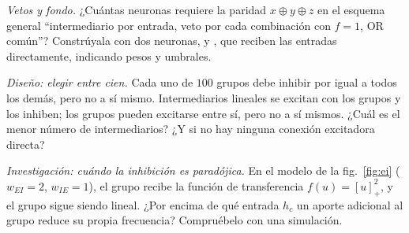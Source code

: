 \begin{exercise}[\lvlB]
\label{ex:03:6}
\emph{Vetos y fondo.} ¿Cuántas neuronas requiere la paridad $x\oplus y\oplus z$ en el esquema general “intermediario  por entrada, veto por cada combinación con $f=1$, OR común”? Constrúyala con dos neuronas,  y , que reciben las entradas directamente, indicando pesos y umbrales.
\end{exercise}

\begin{exercise}[\lvlC]
\label{ex:03:7}
\emph{Diseño: elegir entre cien.} Cada uno de $100$ grupos  debe inhibir por igual a todos los demás, pero no a sí mismo. Intermediarios  lineales se excitan con los grupos y los inhiben; los grupos pueden excitarse entre sí, pero no a sí mismos. ¿Cuál es el menor número de intermediarios? ¿Y si no hay ninguna conexión excitadora directa?
\end{exercise}

\begin{exercise}[\lvlC]
\label{ex:03:8}
\emph{Investigación: cuándo la inhibición es paradójica.} En el modelo de la fig.~\ref{fig:ei} ($w_{EI}=2$, $w_{IE}=1$), el grupo  recibe la función de transferencia $f(u)=[u]_+^2$, y el grupo  sigue siendo lineal. ¿Por encima de qué entrada $h_c$ un aporte adicional al grupo  reduce su propia frecuencia? Compruébelo con una simulación.
\end{exercise}
